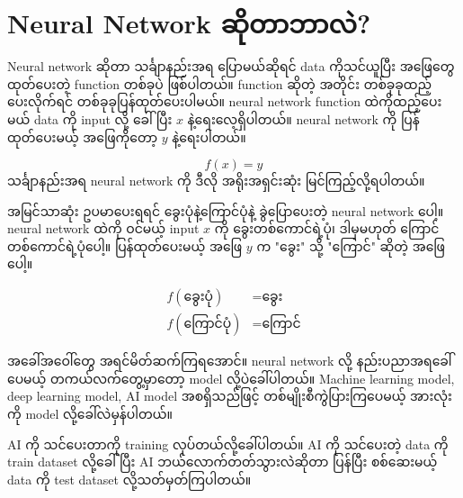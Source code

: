 \chapter{Neural Network ဆိုတာဘာလဲ?}

Neural network ဆိုတာ သင်္ချာနည်းအရ ပြောမယ်ဆိုရင် data ကိုသင်ယူပြီး အဖြေတွေထုတ်ပေးတဲ့ function တစ်ခုပဲ ဖြစ်ပါတယ်။
function ဆိုတဲ့ အတိုင်း တစ်ခုခုထည့်ပေးလိုက်ရင် တစ်ခုခုပြန်ထုတ်ပေးပါမယ်။ neural network function ထဲကိုထည့်ပေးမယ် data ကို input လို့
ခေါ်ပြီး $x$ နဲ့ရေးလေ့ရှိပါတယ်။
neural network ကို ပြန်ထုတ်ပေးမယ့် အဖြေကိုတော့ $y$ နဲ့ရေးပါတယ်။

$$
f(x) = y
$$
သင်္ချာနည်းအရ neural network ကို ဒီလို အရိုးအရှင်းဆုံး မြင်ကြည့်လို့ရပါတယ်။

အမြင်သာဆုံး ဥပမာပေးရရင် ခွေးပုံနဲ့ကြောင်ပုံနဲ့ ခွဲပြောပေးတဲ့ neural network ပေါ့။ neural network ထဲကို ဝင်မယ့် input $x$ ကို ခွေးတစ်ကောင်ရဲ့ပုံ၊ ဒါမှမဟုတ် ကြောင်တစ်ကောင်ရဲ့ပုံပေါ့။ ပြန်ထုတ်ပေးမယ့် အဖြေ $y$ က "ခွေး" သို့ "ကြောင်" ဆိုတဲ့ အဖြေပေါ့။

$$
\begin{aligned}
f(\text{ခွေးပုံ}) &= \text{ခွေး} \\
f(\text{ကြောင်ပုံ}) &= \text{ကြောင်}
\end{aligned}
$$

အခေါ်အဝေါ်တွေ အရင်မိတ်ဆက်ကြရအောင်။ neural network လို့ နည်းပညာအရခေါ်ပေမယ့် တကယ်လက်တွေ့မှာတော့ model လို့ပဲခေါ်ပါတယ်။
Machine learning model, deep learning model, AI model အစရှိသည်ဖြင့် တစ်မျိုးစီကွဲပြားကြပေမယ့် အားလုံးကို model လို့ခေါ်လဲမှန်ပါတယ်။

AI ကို သင်ပေးတာကို training လုပ်တယ်လို့ခေါ်ပါတယ်။ AI ကို သင်ပေးတဲ့ data ကို train dataset လို့ခေါ်ပြီး AI ဘယ်လောက်တတ်သွားလဲဆိုတာ
ပြန်ပြီး စစ်ဆေးမယ့် data ကို test dataset လို့သတ်မှတ်ကြပါတယ်။



